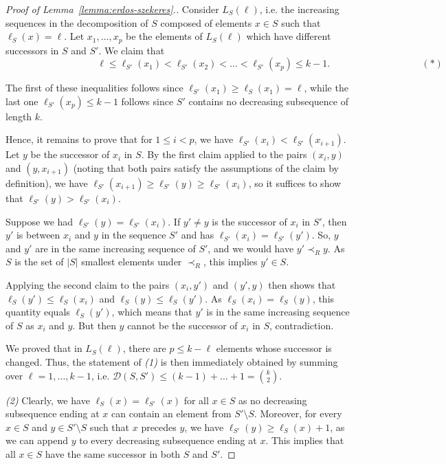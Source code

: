 \documentclass[11pt]{amsart}
\theoremstyle{definition}
\newcommand{\cD}{\mathcal{D}}
\begin{document}
\begin{proof}[Proof of Lemma~\ref{lemma:erdos-szekeres}.]
Consider $L_S(\ell)$, i.e. the increasing sequences in the decomposition of $S$ composed of elements $x\in S$ such that $\ell_S(x)=\ell$. Let $x_1, \dots, x_p$ be the elements of $L_S(\ell)$ which have different successors in $S$ and $S'$.
We claim that 
\begin{equation*}
\hspace{4cm}\ell \leq \ell_{S'}(x_1) < \ell_{S'}(x_2) < \dots < \ell_{S'}(x_p) \leq k-1.\hspace{4cm} (*)
\end{equation*}
    
The first of these inequalities follows since $\ell_{S'}(x_1) \geq \ell_S(x_1) = \ell$, while the last one $\ell_{S'}(x_p) \leq k-1$ follows since $S'$ contains no decreasing subsequence of length $k$.

Hence, it remains to prove that for $1\leq i < p$, we have $\ell_{S'}(x_i) < \ell_{S'}(x_{i+1})$. Let $y$ be the successor of $x_i$ in $S$. By the first claim applied to the pairs $(x_i, y)$ and $(y, x_{i+1})$ (noting that both pairs satisfy the assumptions of the claim by definition), we have $\ell_{S'}(x_{i+1})\geq \ell_{S'}(y)\geq \ell_{S'}(x_i)$, so it suffices to show that $\ell_{S'}(y)>\ell_{S'}(x_i)$.

Suppose we had $\ell_{S'}(y)=\ell_{S'}(x_i)$. If $y'\neq y$ is the successor of $x_i$ in $S'$, then $y'$ is between $x_i$ and $y$ in the sequence $S'$ and has $\ell_{S'}(x_i)=\ell_{S'}(y')$. So, $y$ and $y'$ are in the same increasing sequence of $S'$, and we would have $y'\prec_R y$. As $S$ is the set of $|S|$ smallest elements under $\prec_R$, this implies $y'\in S$.

Applying the second claim to the pairs $(x_i, y')$ and $(y', y)$ then shows that $\ell_{S}(y') \leq \ell_S(x_i)$ and $\ell_S(y)\leq \ell_S(y')$. As $\ell_S(x_i)=\ell_S(y)$, this quantity equals $\ell_S(y')$, which means that $y'$ is in the same increasing sequence of $S$ as $x_i$ and $y$. But then $y$ cannot be the successor of $x_i$ in $S$, contradiction.

We proved that in $L_S(\ell)$, there are $p \leq k - \ell$ elements whose successor is changed. Thus, the statement of \textit{(1)} is then immediately obtained by summing over $\ell=1, \dots, k-1$, i.e. $\cD(S,S')\leq (k-1)+\dots+1=\binom{k}{2}$. 


\bigskip
\noindent
\textit{(2)} Clearly, we have $\ell_S(x) = \ell_{S'}(x)$ for all $x \in S$ as no decreasing subsequence ending at $x$ can contain an element from $S' \setminus S$. Moreover, for every $x \in S$ and  $y \in S' \setminus S$ such that $x$ precedes $y$, we have $\ell_{S'}(y) \geq \ell_S(x) + 1$, as we can append $y$ to every decreasing subsequence ending at $x$. This implies that all $x \in S$ have the same successor in both $S$ and $S'$.


\end{proof}
\end{document}
